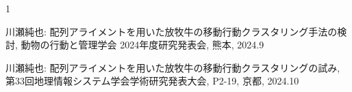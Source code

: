 \begin{発表}{1}

川瀬純也: 配列アライメントを用いた放牧牛の移動行動クラスタリング手法の検討, 動物の行動と管理学会 2024年度研究発表会, 熊本, 2024.9

川瀬純也: 配列アライメントを用いた放牧牛の移動行動クラスタリングの試み, 第33回地理情報システム学会学術研究発表大会, P2-19, 京都, 2024.10

\end{発表}